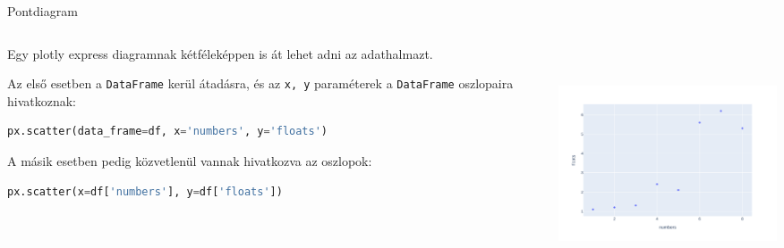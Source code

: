 \documentclass[english, aspectratio=169]{beamer}
\begin{document}
	\begin{frame}[fragile]{Pontdiagram}
		\begin{columns}
			\begin{column}{.5\textwidth}
				Egy plotly express diagramnak kétféleképpen is át lehet adni az adathalmazt.\par\medskip
				Az első esetben a \texttt{DataFrame} kerül átadásra, és az \texttt{x, y} paraméterek a \texttt{DataFrame} oszlopaira hivatkoznak:
				\begin{lstlisting}[language=python]
px.scatter(data_frame=df, x='numbers', y='floats')
				\end{lstlisting}
				A másik esetben pedig közvetlenül vannak hivatkozva az oszlopok:
				\begin{lstlisting}[language=python]
px.scatter(x=df['numbers'], y=df['floats'])
				\end{lstlisting}
			\end{column}
			\begin{column}{.5\textwidth}
				\includegraphics[width=7cm, height=7cm, keepaspectratio]{images/plots_8.png}
			\end{column}
		\end{columns}
	\end{frame}
	
\end{document}
